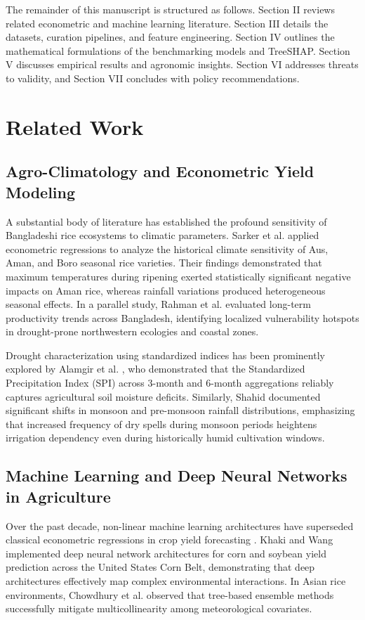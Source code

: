 \documentclass[conference]{IEEEtran}
\begin{document}
The remainder of this manuscript is structured as follows. Section II reviews related econometric and machine learning literature. Section III details the datasets, curation pipelines, and feature engineering. Section IV outlines the mathematical formulations of the benchmarking models and TreeSHAP. Section V discusses empirical results and agronomic insights. Section VI addresses threats to validity, and Section VII concludes with policy recommendations.

\section{Related Work}
\subsection{Agro-Climatology and Econometric Yield Modeling}
A substantial body of literature has established the profound sensitivity of Bangladeshi rice ecosystems to climatic parameters. Sarker et al. \cite{sarker2012climate, sarker2014impact} applied econometric regressions to analyze the historical climate sensitivity of Aus, Aman, and Boro seasonal rice varieties. Their findings demonstrated that maximum temperatures during ripening exerted statistically significant negative impacts on Aman rice, whereas rainfall variations produced heterogeneous seasonal effects. In a parallel study, Rahman et al. \cite{rahman2018trends} evaluated long-term productivity trends across Bangladesh, identifying localized vulnerability hotspots in drought-prone northwestern ecologies and coastal zones. 

Drought characterization using standardized indices has been prominently explored by Alamgir et al. \cite{alamgir2015meteorological}, who demonstrated that the Standardized Precipitation Index (SPI) across 3-month and 6-month aggregations reliably captures agricultural soil moisture deficits. Similarly, Shahid \cite{shahid2010rain} documented significant shifts in monsoon and pre-monsoon rainfall distributions, emphasizing that increased frequency of dry spells during monsoon periods heightens irrigation dependency even during historically humid cultivation windows.

\subsection{Machine Learning and Deep Neural Networks in Agriculture}
Over the past decade, non-linear machine learning architectures have superseded classical econometric regressions in crop yield forecasting \cite{nasir2020crop}. Khaki and Wang \cite{khaki2019crop} implemented deep neural network architectures for corn and soybean yield prediction across the United States Corn Belt, demonstrating that deep architectures effectively map complex environmental interactions. In Asian rice environments, Chowdhury et al. \cite{chowdhury2021impact} observed that tree-based ensemble methods successfully mitigate multicollinearity among meteorological covariates.
\end{document}
